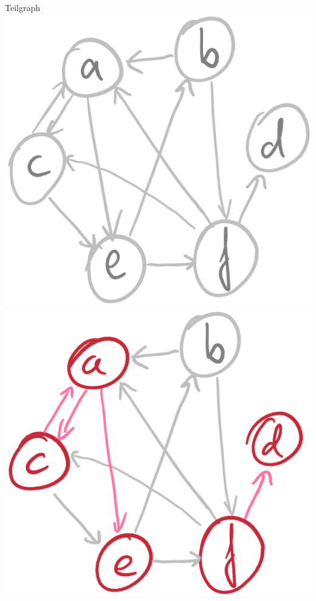\documentclass[handout]{beamer}
\begin{document}
\begin{frame}{Teilgraph}
	\includegraphics[scale=0.2]{images/graph_teilgraph_01.png}\ip
	\includegraphics[scale=0.2]{images/graph_teilgraph_02.png}\ip

\end{frame}
\end{document}
